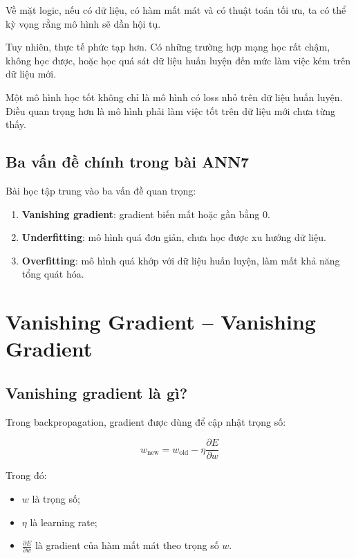 Về mặt logic, nếu có dữ liệu, có hàm mất mát và có thuật toán tối ưu, ta có thể kỳ vọng rằng mô hình sẽ dần hội tụ.

Tuy nhiên, thực tế phức tạp hơn. Có những trường hợp mạng học rất chậm, không học được, hoặc học quá sát dữ liệu huấn luyện đến mức làm việc kém trên dữ liệu mới.

\begin{ghinho}
Một mô hình học tốt không chỉ là mô hình có loss nhỏ trên dữ liệu huấn luyện. Điều quan trọng hơn là mô hình phải làm việc tốt trên dữ liệu mới chưa từng thấy.
\end{ghinho}

\subsection{Ba vấn đề chính trong bài ANN7}

Bài học tập trung vào ba vấn đề quan trọng:

\begin{enumerate}
    \item \textbf{Vanishing gradient}: gradient biến mất hoặc gần bằng 0.
    \item \textbf{Underfitting}: mô hình quá đơn giản, chưa học được xu hướng dữ liệu.
    \item \textbf{Overfitting}: mô hình quá khớp với dữ liệu huấn luyện, làm mất khả năng tổng quát hóa.
\end{enumerate}

\section{Vanishing Gradient -- Vanishing Gradient}

\subsection{Vanishing gradient là gì?}

Trong backpropagation, gradient được dùng để cập nhật trọng số:

\[
    w_{\text{new}}
    =
    w_{\text{old}}
    -
    \eta
    \frac{\partial E}{\partial w}
\]

Trong đó:

\begin{itemize}
    \item $w$ là trọng số;
    \item $\eta$ là learning rate;
    \item $\frac{\partial E}{\partial w}$ là gradient của hàm mất mát theo trọng số $w$.
\end{itemize}

